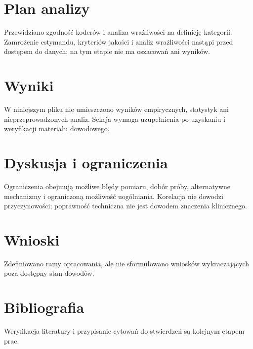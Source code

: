 \documentclass[11pt,a4paper]{article}
\begin{document}
\section{Plan analizy}

Przewidziano zgodność koderów i analiza wrażliwości na definicję kategorii. Zamrożenie estymandu, kryteriów jakości i analiz wrażliwości nastąpi przed dostępem do danych; na tym etapie nie ma oszacowań ani wyników.

\section{Wyniki}

W niniejszym pliku nie umieszczono wyników empirycznych, statystyk ani nieprzeprowadzonych analiz. Sekcja wymaga uzupełnienia po uzyskaniu i weryfikacji materiału dowodowego.

\section{Dyskusja i ograniczenia}

Ograniczenia obejmują możliwe błędy pomiaru, dobór próby, alternatywne mechanizmy i ograniczoną możliwość uogólniania. Korelacja nie dowodzi przyczynowości; poprawność techniczna nie jest dowodem znaczenia klinicznego.

\section{Wnioski}

Zdefiniowano ramy opracowania, ale nie sformułowano wniosków wykraczających poza dostępny stan dowodów.

\section*{Bibliografia}

Weryfikacja literatury i przypisanie cytowań do stwierdzeń są kolejnym etapem prac.
\end{document}

